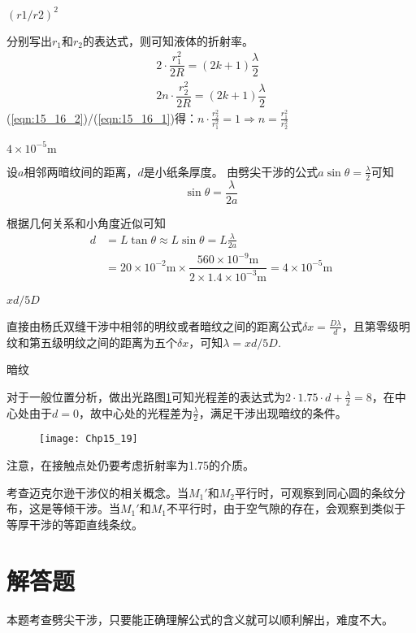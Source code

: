 \exercise $(r1/r2)^2$

\solve 分别写出$r_1$和$r_2$的表达式，则可知液体的折射率。
\begin{gather}
	2\cdot\dfrac{r_1^2}{2R}=(2k+1)\dfrac{\lambda}{2}\label{eqn:15_16_1}\\
	2n\cdot\dfrac{r_2^2}{2R}=(2k+1)\dfrac{\lambda}{2}\label{eqn:15_16_2}
\end{gather}
(\ref{eqn:15_16_2})/(\ref{eqn:15_16_1})得：$n\cdot\frac{r_2^2}{r_1^2}=1\Rightarrow n=\frac{r_1^2}{r_2^2}$


\exercise $4\times10^{-5}\mathrm{m}$

\solve 设$a$相邻两暗纹间的距离，$d$是小纸条厚度。
由劈尖干涉的公式$a\sin\theta=\frac{\lambda}{2}$可知
\[
\sin\theta=\frac{\lambda}{2a}
\]

根据几何关系和小角度近似可知
\begin{align*}
d&=L\tan\theta\approx L\sin\theta=L\frac{\lambda}{2a}\\
&=20\times 10^{-2}\mathrm{m}\times \dfrac{560\times 10^{-9}\mathrm{m}}{2\times 1.4\times 10^{-3}\mathrm{m}}=4\times 10^{-5}\mathrm{m}
\end{align*}

\exercise $xd/5D$

\solve 直接由杨氏双缝干涉中相邻的明纹或者暗纹之间的距离公式$\delta x=\frac{D\lambda}{d}$，且第零级明纹和第五级明纹之间的距离为五个$\delta x$，可知$\lambda=xd/5D$.

\exercise 暗纹

\solve 对于一般位置分析，做出光路图\ref{fig:15_19}可知光程差的表达式为$2\cdot 1.75\cdot d+\frac{\lambda}{2}=8$，在中心处由于$d=0$，故中心处的光程差为$\frac{\lambda}{2}$，满足干涉出现暗纹的条件。
\begin{figure}[!h]
	\centering
	\texttt{[image: Chp15\_19]}
	\caption{}\label{fig:15_19}
\end{figure}

注意，在接触点处仍要考虑折射率为1.75的介质。

\exercise 

\solve 考查迈克尔逊干涉仪的相关概念。当$M_1'$和$M_2$平行时，可观察到同心圆的条纹分布，这是等倾干涉。当$M_1'$和$M_1$不平行时，由于空气隙的存在，会观察到类似于等厚干涉的等距直线条纹。

\section{解答题}
\exercise 

\analysis
本题考查劈尖干涉，只要能正确理解公式的含义就可以顺利解出，难度不大。

